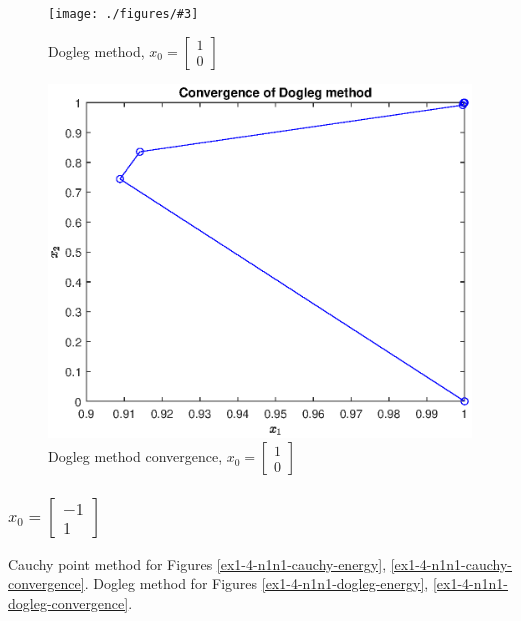 \documentclass[unicode,11pt,a4paper,oneside,numbers=endperiod,openany]{scrartcl}
\newcommand{\myvec}[1]{\begin{bmatrix} #1 \end{bmatrix}}
\newcommand{\myFigureEnergy}[3]{
    \begin{figure}[htbp]
    \centering
    \caption{#1}
    \label{#2}
    \texttt{[image: ./figures/\#3]}
    \end{figure}
}
\begin{document}
\myFigureEnergy{Dogleg method, $x_0 = \myvec{1 \\ 0}$}{ex1-4-10-dogleg-energy}{ex1-4-10-dogleg-energy.eps}
\begin{figure}[htbp]
\centering
\caption{Dogleg method convergence, $x_0 = \myvec{1 \\ 0}$}
\label{ex1-4-10-dogleg-convergence}
\includegraphics[width=\textwidth, trim={0cm 0cm 0cm 0cm}]{./figures/ex1-4-10-dogleg-convergence.eps}
\end{figure}

\subsubsection*{$x_0 = \myvec{-1 \\ 1}$}
Cauchy point method for Figures \ref{ex1-4-n1n1-cauchy-energy}, \ref{ex1-4-n1n1-cauchy-convergence}.
Dogleg method for Figures \ref{ex1-4-n1n1-dogleg-energy}, \ref{ex1-4-n1n1-dogleg-convergence}.
\end{document}
